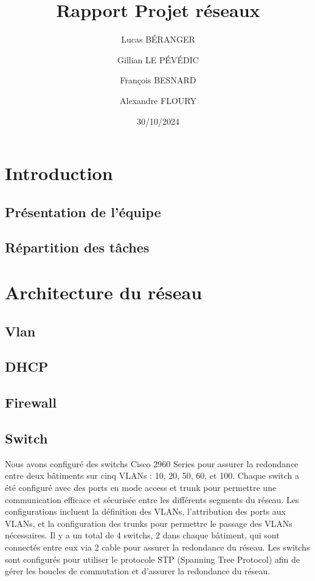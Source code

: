 \documentclass[a4paper,12pt]{report}
\title{Rapport Projet réseaux}
\author{
    Lucas BÉRANGER \and 
    Gillian LE PÉVÉDIC \and
    François BESNARD \and
    Alexandre FLOURY \and
}
\date{30/10/2024}
\begin{document}
    \maketitle  
    \newpage

    \tableofcontents
    \newpage

    \chapter{Introduction}
        \section{Présentation de l'équipe}
        \section{Répartition des tâches}


    \chapter{Architecture du réseau}
        \section{Vlan}
        \section{DHCP}
        \section{Firewall}
        \section{Switch}
        Nous avons configuré des switchs Cisco 2960 Series pour assurer la redondance entre deux bâtiments sur cinq VLANs : 10, 20, 50, 60, et 100. Chaque switch a été configuré avec des ports en mode access et trunk pour permettre une communication efficace et sécurisée entre les différents segments du réseau. Les configurations incluent la définition des VLANs, l'attribution des ports aux VLANs, et la configuration des trunks pour permettre le passage des VLANs nécessaires.
        Il y a un total de 4 switchs, 2 dans chaque bâtiment, qui sont connectés entre eux via 2 cable pour assurer la redondance du réseau. Les switchs sont configurés pour utiliser le protocole STP (Spanning Tree Protocol) afin de gérer les boucles de commutation et d'assurer la redondance du réseau.
\end{document}

